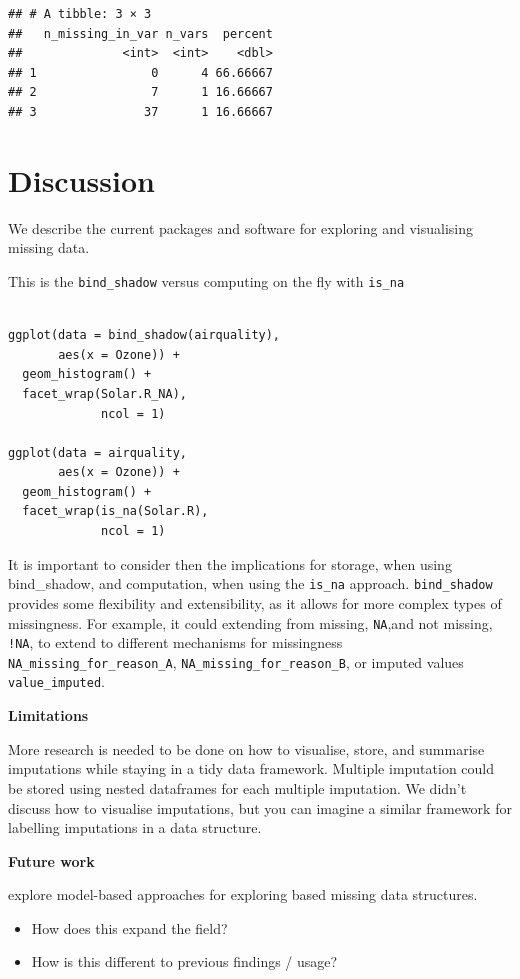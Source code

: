 \documentclass[]{article}
\providecommand{\tightlist}{%
  \setlength{\itemsep}{0pt}\setlength{\parskip}{0pt}}
\begin{document}
\begin{verbatim}
## # A tibble: 3 × 3
##   n_missing_in_var n_vars  percent
##              <int>  <int>    <dbl>
## 1                0      4 66.66667
## 2                7      1 16.66667
## 3               37      1 16.66667
\end{verbatim}

\section{Discussion}\label{discussion}

We describe the current packages and software for exploring and
visualising missing data.

This is the \texttt{bind\_shadow} versus computing on the fly with
\texttt{is\_na}

\begin{verbatim}

ggplot(data = bind_shadow(airquality),
       aes(x = Ozone)) + 
  geom_histogram() + 
  facet_wrap(Solar.R_NA),
             ncol = 1)
             
ggplot(data = airquality,
       aes(x = Ozone)) + 
  geom_histogram() + 
  facet_wrap(is_na(Solar.R),
             ncol = 1)
\end{verbatim}

It is important to consider then the implications for storage, when
using bind\_shadow, and computation, when using the \texttt{is\_na}
approach. \texttt{bind\_shadow} provides some flexibility and
extensibility, as it allows for more complex types of missingness. For
example, it could extending from missing, \texttt{NA},and not missing,
\texttt{!NA}, to extend to different mechanisms for missingness
\texttt{NA\_missing\_for\_reason\_A},
\texttt{NA\_missing\_for\_reason\_B}, or imputed values
\texttt{value\_imputed}.

\textbf{Limitations}

More research is needed to be done on how to visualise, store, and
summarise imputations while staying in a tidy data framework. Multiple
imputation could be stored using nested dataframes for each multiple
imputation. We didn't discuss how to visualise imputations, but you can
imagine a similar framework for labelling imputations in a data
structure.

\textbf{Future work}

explore model-based approaches for exploring based missing data
structures.

\begin{itemize}
\tightlist
\item
  How does this expand the field?
\item
  How is this different to previous findings / usage?
\end{itemize}
\end{document}
